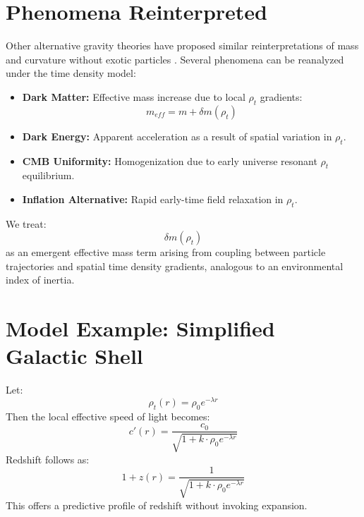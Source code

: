 \documentclass[12pt]{article}
\begin{document}
\section{Phenomena Reinterpreted}
Other alternative gravity theories have proposed similar reinterpretations of mass and curvature without exotic particles \cite{moffat2006}.
Several phenomena can be reanalyzed under the time density model:
\begin{itemize}
  \item \textbf{Dark Matter:} Effective mass increase due to local $\rho_t$ gradients:
    \[ m_{eff} = m + \delta m(\rho_t) \]
  \item \textbf{Dark Energy:} Apparent acceleration as a result of spatial variation in $\rho_t$.
  \item \textbf{CMB Uniformity:} Homogenization due to early universe resonant $\rho_t$ equilibrium.
  \item \textbf{Inflation Alternative:} Rapid early-time field relaxation in $\rho_t$.
\end{itemize}
We treat: \[\delta m(\rho_t)\] as an emergent effective mass term arising from coupling between particle trajectories and spatial time density gradients, analogous to an environmental index of inertia.

\section{Model Example: Simplified Galactic Shell}
Let:
\[ \rho_t(r) = \rho_0 e^{-\lambda r} \]
Then the local effective speed of light becomes:
\[ c'(r) = \frac{c_0}{\sqrt{1 + k \cdot \rho_0 e^{-\lambda r}}} \]
Redshift follows as:
\[ 1 + z(r) = \frac{1}{\sqrt{1 + k \cdot \rho_0 e^{-\lambda r}}} \]
This offers a predictive profile of redshift without invoking expansion.
\end{document}
